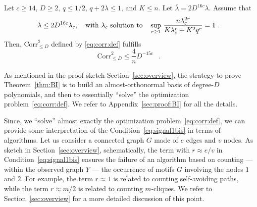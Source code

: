 \documentclass[final]{colt2026}
\newcommand{\1}{\mathbf{1}}
\newcommand{\ac}[1]{\left\{#1\right\}}
\newcommand{\cro}[1]{\left[#1\right]}
\begin{document}
\begin{theorem}\label{thm:BI}
    Let $c\geq 14$, $D\geq 2$, $q\leq 1/2$, $q+2\lambda \leq 1$, and  $K\leq n$. 
    Let $\bar \lambda = 2 D^{16c}\lambda$. 
    Assume that 
\begin{align}\label{eq:signal1bis} 
 \lambda \leq  2 D^{16c}\lambda_{c},\quad \text{with $\lambda_{c}$ solution to}\quad \sup_{r\geq 1}\, {n\lambda_{c}^{2r}\over K\lambda_{c}^{r}+K^2 \bar q^{r}}=1\ .
\end{align}
Then, $\mathrm{Corr}^2_{\leq D}$ defined by \eqref{eq:corr:def} fulfills
$$\mathrm{Corr}^2_{\leq D} \leq \frac{4}{n}D^{-15 c}\enspace \ .$$
\end{theorem}

 As mentioned in the proof sketch  Section~\ref{sec:overview}, the strategy to prove Theorem~\eqref{thm:BI} is to build an almost-orthonormal basis of degree-$D$ polynomials, and then to  essentially ``solve'' the optimization problem~\eqref{eq:corr:def}.   
 We refer to Appendix~\ref{sec:proof:BI} for all the details.
 
 Since, we ``solve'' almost exactly the optimization problem~\eqref{eq:corr:def}, we can provide some interpretation of the Condition~\eqref{eq:signal1bis} in terms of algorithms. Let us consider a connected graph $G$ made of $e$ edges and $v$ nodes. As sketch in Section~\ref{sec:overview}, schematically, the term with $r\approx e/v$ in Condition~\eqref{eq:signal1bis} ensures the failure of an algorithm based on  counting --- within the observed graph $Y$ ---  the occurrence of motifs $G$ involving the nodes $1$ and $2$. For example, the term $r\approx1$ is related to counting self-avoiding paths, while the term $r\approx m/2$ is related to counting $m$-cliques. We refer to Section~\ref{sec:overview} for a more detailed discussion of this point.
\end{document}
